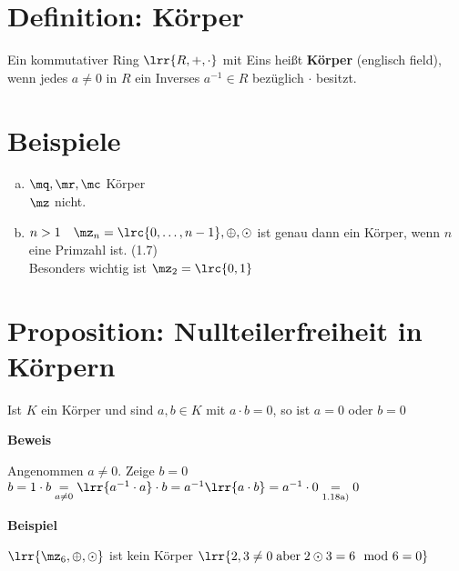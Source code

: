 \section{Definition: Körper}
	Ein kommutativer Ring $\lrr{R,+,\cdot}$ mit Eins heißt \textbf{Körper} (englisch field), wenn jedes $a\neq 0$ in $R$ ein Inverses $a^{-1}\in R$ bezüglich $\cdot$ besitzt.
\section{Beispiele}
	\begin{enumerate}[a)]
		\item $\mq,\mr,\mc$ Körper\\
			$\mz$ nicht.
		\item $n>1\quad\mz_n=\lrc{0,\dots,n-1},\oplus,\odot$ ist genau dann ein Körper, wenn $n$ eine Primzahl ist. (1.7)\\
			Besonders wichtig ist $\mz_2=\lrc{0,1}$
	\end{enumerate}
\section{Proposition: Nullteilerfreiheit in Körpern}
	Ist $K$ ein Körper und sind $a,b\in K$ mit $a\cdot b=0$, so ist $a=0$ oder $b=0$

	\textbf{Beweis}

	Angenommen $a\neq 0$. Zeige $b=0$\\
	$b=1\cdot b \underset{a\neq 0}{=} \lrr{a^{-1}\cdot a}\cdot b=a^{-1}\lrr{a\cdot b}=a^{-1}\cdot 0\underset{\mbox{\scriptsize 1.18a)}}{=}0$

	\textbf{Beispiel}

	$\lrr{\mz_6,\oplus,\odot}$ ist kein Körper $\lrr{2,3\neq 0 \;\mbox{aber}\; 2\odot 3=6\mod 6 =0}$
